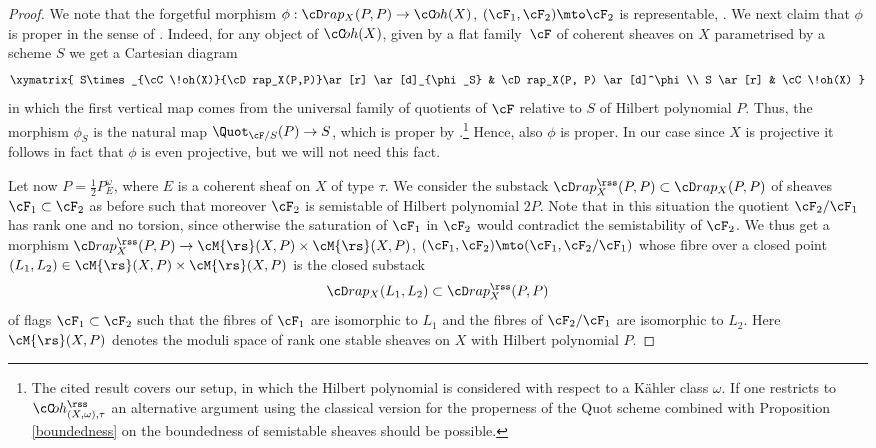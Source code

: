 \begin{proof}
We note that the forgetful morphism $\phi:\cD rap_X(P,P)\to\cC\!oh(X)$, $(\cF_1,\cF_2)\mto\cF_2$ is representable, \cf \cite[\href{https://stacks.math.columbia.edu/tag/04YY}{Tag\,04YY}]{stacks-project}. We next claim that $\phi$
is proper in the sense of \cite[Définition 3.10.1]{LaumonMB}. Indeed, for any object of $\cC\!oh(X)$, given by a flat family~$\cF$ of coherent sheaves on $X$ parametrised by a scheme $S$ we get a Cartesian diagram
\begin{equation*}
\label{diagr: }
\begin{gathered}
\xymatrix{
S\times_{\cC\!oh(X)}{\cD rap_X(P,P)}\ar[r] \ar[d]_{\phi_S} & \cD rap_X(P, P) \ar[d]^\phi \\
S \ar[r] & \cC\!oh(X)
}
\end{gathered}
\end{equation*}
in which the first vertical map comes from the universal family of quotients of $\cF$ relative to $S$ of Hilbert polynomial $P$. Thus, the morphism $\phi_S$ is the natural map $\Quot_{\cF/S}(P)\to S$, which is proper by \cite[Cor.\,6.1]{TomaLimitareaII}.\footnote{The cited result covers our setup, in which the Hilbert polynomial is considered with respect to a Kähler class $\omega$. If one restricts to $\cC\!oh_{(X,\omega),\tau}^{{\rss}}$ an alternative argument using the classical version for the properness of the Quot scheme combined with Proposition \ref{boundedness} on the boundedness of semistable sheaves should be possible.}
Hence, also $\phi$ is proper. In our case since $X$ is projective it follows in fact that $\phi$ is even projective, but we will not need this fact.

Let now $P=\frac{1}{2}P_E^\omega$, where $E$ is a coherent sheaf on $X$ of type $\tau$.
We consider the substack $\cD rap^{{\rss}}_X(P,P)\subset\cD rap_X(P,P)$ of sheaves $\cF_1\subset \cF_2$ as before such that moreover $\cF_2$ is semistable of Hilbert polynomial $2P$.
Note that in this situation the quotient $\cF_2/\cF_1$ has rank one and no torsion, since otherwise the saturation of $\cF_1$ in $\cF_2$ would contradict the semistability of $\cF_2$.
We thus get a morphism $\cD rap^{{\rss}}_X(P,P)\to\cM{\rs}(X,P)\times\cM{\rs}(X,P)$, $(\cF_1,\cF_2)\mto(\cF_1,\cF_2/\cF_1)$ whose fibre over a closed point $(L_1,L_2)\in\cM{\rs}(X,P)\times\cM{\rs}(X,P)$ is the closed substack
\[\cD rap_X(L_1,L_2)\subset\cD rap^{{\rss}}_X(P,P)\]
of flags $\cF_1\subset \cF_2$ such that the fibres of $\cF_1$ are isomorphic to $L_1$ and the fibres of $\cF_2/\cF_1$ are isomorphic to $L_2$. Here $\cM{\rs}(X,P)$ denotes the moduli space of rank one stable sheaves on $X$ with Hilbert polynomial $P$.


\end{proof}

